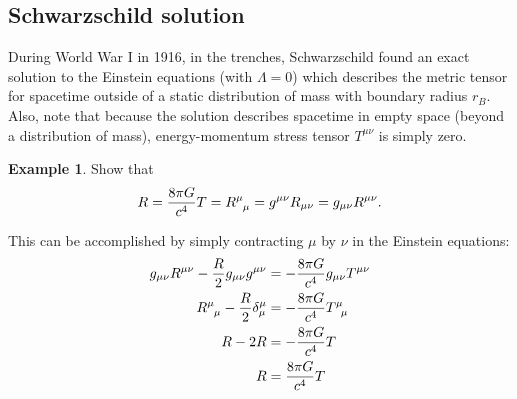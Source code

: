 \documentclass{article}
\theoremstyle{definition}
\newtheorem{exmp}{Example}[section]
\begin{document}
\subsection{Schwarzschild solution}
During World War I in 1916, in the trenches, Schwarzschild found an exact solution to the Einstein equations (with $\Lambda = 0$) which describes the metric tensor for spacetime outside of a static distribution of mass with boundary radius $r_B$. Also, note that because the solution describes spacetime in empty space (beyond a distribution of mass), energy-momentum stress tensor $T^{\mu\nu}$ is simply zero.\\

\begin{exmp}
	Show that
	\begin{align*}
	R = \frac{8\pi G}{c^4}T = \tensor{R}{^\mu_\mu} = g^{\mu\nu}R_{\mu\nu} = g_{\mu\nu}R^{\mu\nu}.
	\end{align*}
	
	This can be accomplished by simply contracting $\mu$ by $\nu$ in the Einstein equations:
	\begin{align*}
	g_{\mu\nu}R^{\mu\nu} - \frac{R}{2}g_{\mu\nu}g^{\mu\nu} &= -\frac{8\pi G}{c^4}g_{\mu\nu}T^{\mu\nu}\\
	\tensor{R}{^\mu_\mu} - \frac{R}{2}\delta^{\mu}_{\mu} &= -\frac{8\pi G}{c^4}\tensor{T}{^\mu_\mu}\\
	R - 2R &= -\frac{8\pi G}{c^4}T\\
	R &= \frac{8\pi G}{c^4}T
	\end{align*}
\end{exmp}
\end{document}
